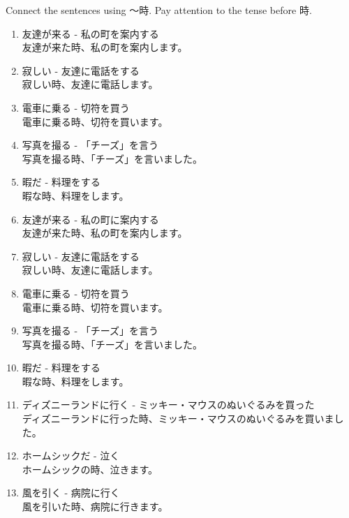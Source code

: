 \documentclass[notoc,notitlepage]{tufte-book}
\begin{document}
\begin{ex}
  Connect the sentences using 〜時. Pay attention to the tense before 時.

  \begin{enumerate}
    \item 友達が来る - 私の町を案内する \\
      友達が来た時、私の町を案内します。
    \item 寂しい - 友達に電話をする \\
      寂しい時、友達に電話します。
    \item 電車に乗る - 切符を買う \\
      電車に乗る時、切符を買います。
    \item 写真を撮る - 「チーズ」を言う \\
      写真を撮る時、「チーズ」を言いました。
    \item 暇だ - 料理をする \\
      暇な時、料理をします。
    \item 友達が来る - 私の町に案内する \\
      友達が来た時、私の町を案内します。
    \item 寂しい - 友達に電話をする \\
      寂しい時、友達に電話します。
    \item 電車に乗る - 切符を買う \\
      電車に乗る時、切符を買います。
    \item 写真を撮る - 「チーズ」を言う \\
      写真を撮る時、「チーズ」を言いました。
    \item 暇だ - 料理をする \\
      暇な時、料理をします。
    \item ディズニーランドに行く - ミッキー・マウスのぬいぐるみを買った \\
      ディズニーランドに行った時、ミッキー・マウスのぬいぐるみを買いました。
    \item ホームシックだ - 泣く \\
      ホームシックの時、泣きます。
    \item 風を引く - 病院に行く \\
      風を引いた時、病院に行きます。
  \end{enumerate}
\end{ex}


\end{document}
